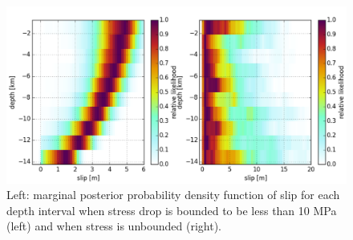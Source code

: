 \documentclass[12pt]{article}
\begin{document}
\begin{figure}
\includegraphics[width=1.0\textwidth]{figure_2}
\raggedleft
\caption{Left: marginal posterior probability density function of slip for each depth interval when stress drop is bounded to be less than 10 MPa (left) and when stress is unbounded (right).}  
\end{figure}

%


\end{document}
